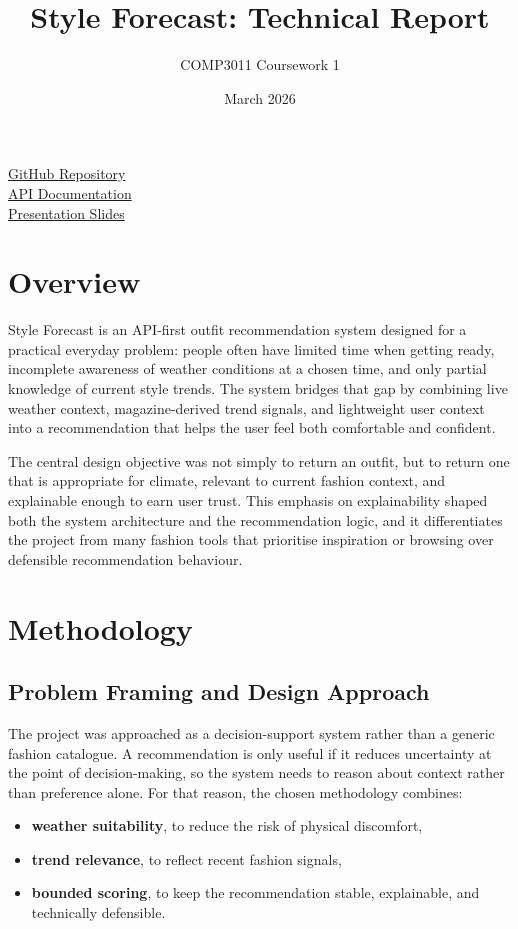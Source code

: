 \documentclass[11pt,a4paper]{article}
\title{\textbf{Style Forecast: Technical Report}}
\author{COMP3011 Coursework 1}
\date{March 2026}
\begin{document}
\maketitle

\begin{center}
\small
\href{https://github.com/elfin-py/COMP3011_Coursework1}{GitHub Repository}\\
\href{https://github.com/elfin-py/COMP3011_Coursework1/blob/main/cfx-api/docs/api.pdf}{API Documentation}\\
\href{https://www.canva.com/design/DAHDvw6j9fw/nSjelXVjA8PyCTkBQnxS8A/view?utm_content=DAHDvw6j9fw&utm_campaign=designshare&utm_medium=link2&utm_source=uniquelinks&utlId=h201e838841}{Presentation Slides}
\end{center}

\section{Overview}
Style Forecast is an API-first outfit recommendation system designed for a practical everyday problem: people often have limited time when getting ready, incomplete awareness of weather conditions at a chosen time, and only partial knowledge of current style trends. The system bridges that gap by combining live weather context, magazine-derived trend signals, and lightweight user context into a recommendation that helps the user feel both comfortable and confident.

The central design objective was not simply to return an outfit, but to return one that is appropriate for climate, relevant to current fashion context, and explainable enough to earn user trust. This emphasis on explainability shaped both the system architecture and the recommendation logic, and it differentiates the project from many fashion tools that prioritise inspiration or browsing over defensible recommendation behaviour.

\section{Methodology}
\subsection{Problem Framing and Design Approach}
The project was approached as a decision-support system rather than a generic fashion catalogue. A recommendation is only useful if it reduces uncertainty at the point of decision-making, so the system needs to reason about context rather than preference alone. For that reason, the chosen methodology combines:
\begin{itemize}
  \item \textbf{weather suitability}, to reduce the risk of physical discomfort,
  \item \textbf{trend relevance}, to reflect recent fashion signals,
  \item \textbf{bounded scoring}, to keep the recommendation stable, explainable, and technically defensible.
\end{itemize}
\end{document}
